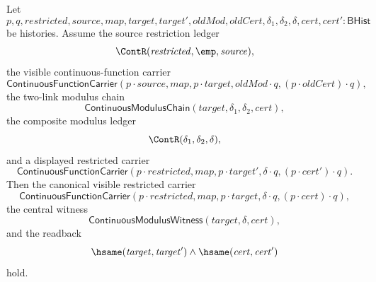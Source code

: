 \begin{theorem}
\label{thm:uniform-continuity-visible-restriction-modulus-chain-commutes}
Let
$$
p,q,\mathit{restricted},\mathit{source},\mathit{map},\mathit{target},\mathit{target}',\mathit{oldMod},\mathit{oldCert},\delta_1,\delta_2,\delta,\mathit{cert},\mathit{cert}' : \mathsf{BHist}
$$
be histories. Assume the source restriction ledger
$$
\ContR(\mathit{restricted},\emp,\mathit{source}),
$$
the visible continuous-function carrier
$$
\mathsf{ContinuousFunctionCarrier}(p\cdot \mathit{source},\mathit{map},p\cdot \mathit{target},
\mathit{oldMod}\cdot q,(p\cdot \mathit{oldCert})\cdot q),
$$
the two-link modulus chain
$$
\mathsf{ContinuousModulusChain}(\mathit{target},\delta_1,\delta_2,\mathit{cert}),
$$
the composite modulus ledger
$$
\ContR(\delta_1,\delta_2,\delta),
$$
and a displayed restricted carrier
$$
\mathsf{ContinuousFunctionCarrier}(p\cdot \mathit{restricted},\mathit{map},p\cdot \mathit{target}',
\delta\cdot q,(p\cdot \mathit{cert}')\cdot q).
$$
Then the canonical visible restricted carrier
$$
\mathsf{ContinuousFunctionCarrier}(p\cdot \mathit{restricted},\mathit{map},p\cdot \mathit{target},
\delta\cdot q,(p\cdot \mathit{cert})\cdot q),
$$
the central witness
$$
\mathsf{ContinuousModulusWitness}(\mathit{target},\delta,\mathit{cert}),
$$
and the readback
$$
\hsame(\mathit{target},\mathit{target}')\land\hsame(\mathit{cert},\mathit{cert}')
$$
hold.
\end{theorem}
